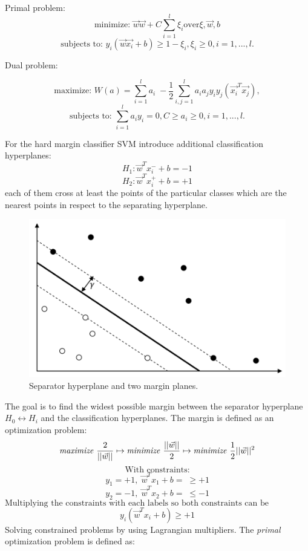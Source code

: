 Primal problem:
\[\textrm{minimize: } \vec{w} \vec{w} + C \sum_{i=1}^{l} \xi_i \textrm{over} \xi,\vec{w},b\] 
\[\textrm{subjects to: } y_i(\vec{w}\vec{x_i} + b) \geq 1 - \xi_i,\xi_i \geq 0, i = 1, ...,l. \] 

Dual problem:

\[\textrm{maximize: } W(a) =  \sum_{i=1}^{l} a_i \; - \frac{1}{2}\sum_{i,j = 1}^{l}a_i a_j y_i y_j (\vec{x_i}^T \vec{x_j}) , \]
\[\textrm{subjects to: } \sum_{i=1}^{l}a_i y_i = 0,C \geq a_i \geq 0, i = 1,...,l.   \] 

For the hard margin classifier SVM introduce additional classification hyperplanes:
\[H_1 : \vec{w}^Tx_i^- + b= -1\] 
\[H_2 : \vec{w}^Tx_i^+ + b= +1\] 
each of them cross at least the points of the particular classes which are the nearest points in respect to the separating hyperplane.
\begin{figure}[h]
    \centering
    \includegraphics[scale=0.4]{Graphics/svm-margins.png}
    \caption{Separator hyperplane and two margin planes.}
    \label{fig:hyperplane3}
\end{figure}
The goal is to find the widest possible margin between the separator hyperplane \(H_0 \longleftrightarrow H_i\) and the classification hyperplanes. The margin is defined as an optimization problem:
\[ \textrm{\textit{maximize} } \frac{2}{||\vec{w}||} \mapsto \textrm{\textit{minimize} } \frac{||\vec{w}||}{2} \mapsto \textrm{\textit{minimize} } \frac{1}{2}||\vec{w}||^2\]
\[\textrm{With constraints:} \]
\[  y_1 = +1, \; \vec{w}^Tx_1 + b = \; \geq +1\]
\[  y_2 = -1, \; \vec{w}^Tx_2 + b = \; \leq -1\]
\[\textrm{Multiplying the constraints with each labels so both     constraints can be substituted to a single one:}\]
\[ y_i(\vec{w}^Tx_i + b) \geq +1\]
Solving constrained problems by using Lagrangian multipliers. The \textit{primal} optimization problem is defined as: 
